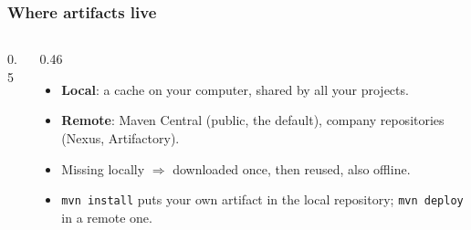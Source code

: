 \documentclass[aspectratio=169,10pt,compress]{beamer}
\begin{document}
\begin{frame}[t,fragile] \frametitle{Where artifacts live}
  \begin{columns}[T]
    \begin{column}{0.5\textwidth}
      \begin{center}
      \end{center}
    \end{column}
    \begin{column}{0.46\textwidth}
      \begin{itemize}\small
        \item \textbf{Local}: a cache on your computer, shared by all your projects.
        \item \textbf{Remote}: Maven Central (public, the default), company repositories (Nexus, Artifactory).
        \item Missing locally $\Rightarrow$ downloaded once, then reused, also offline.
        \item \texttt{mvn install} puts your own artifact in the local repository; \texttt{mvn deploy} in a remote one.
      \end{itemize}
    \end{column}
  \end{columns}
\end{frame}

\end{document}
